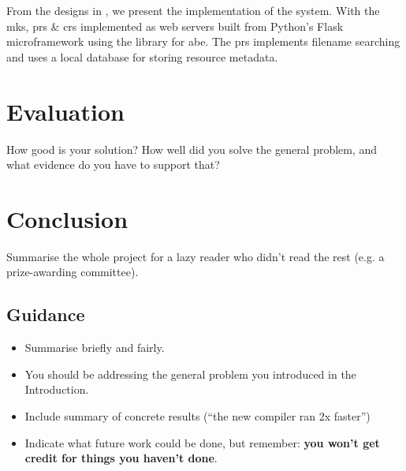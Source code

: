\documentclass[british,table,svgnames,xcdraw]{l4proj}
\begin{document}
From the designs in , we present the implementation of the \theResServer system. With the \acrfull{mks}, \acrfull{prs} \& \acrfull{crs} implemented as web servers built from Python's Flask microframework using the \PyOpenABE library for \acrfull{abe}. The \acrshort{prs} implements filename searching and uses a local database for storing resource metadata.











\chapter{Evaluation}
\label{ch:evaluation}
How good is your solution? How well did you solve the general problem, and what evidence do you have to support that?







\chapter{Conclusion}
\label{ch:conclusion}
Summarise the whole project for a lazy reader who didn't read the rest (e.g. a prize-awarding committee).
\section{Guidance}
\begin{itemize}
    \item
        Summarise briefly and fairly.
    \item
        You should be addressing the general problem you introduced in the
        Introduction.
    \item
        Include summary of concrete results (``the new compiler ran 2x
        faster'')
    \item
        Indicate what future work could be done, but remember: \textbf{you
        won't get credit for things you haven't done}.
\end{itemize}
\end{document}
